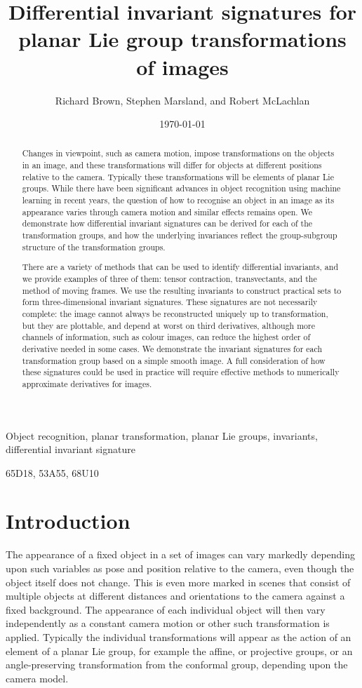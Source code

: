 \documentclass[review,onefignum,onetabnum]{siamonline190516}
\date{\today}
\title{Differential invariant signatures for planar Lie group transformations of images}
\author{Richard Brown, Stephen Marsland, and Robert McLachlan}
\begin{document}
\maketitle
\begin{abstract}
Changes in viewpoint, such as camera motion, impose transformations on the objects in an image, and these transformations will differ for objects at different positions relative to the camera. Typically these transformations will be elements of planar Lie groups. While there have been significant advances in object recognition using machine learning in recent years, the question of how to recognise an object in an image as its appearance varies through camera motion and similar effects remains open. We demonstrate how differential invariant signatures can be derived for each of the transformation groups, and how the underlying invariances reflect the group-subgroup structure of the transformation groups. 

There are a variety of methods that can be used to identify differential invariants, and we provide examples of three of them: tensor contraction, transvectants, and the method of moving frames. We use the resulting invariants to construct practical sets to form three-dimensional invariant signatures. These signatures are not necessarily complete: the image cannot always be reconstructed uniquely up to transformation, but they are plottable, and depend at worst on third derivatives, although more channels of information, such as colour images, can reduce the highest order of derivative needed in some cases. We demonstrate the invariant signatures for each transformation group based on a simple smooth image. A full consideration of how these signatures could be used in practice will require effective methods to numerically approximate derivatives for images.
\end{abstract}


\begin{keywords}
Object recognition, planar transformation, planar Lie groups, invariants, differential invariant signature
\end{keywords}

\begin{AMS}
65D18, 53A55, 68U10
\end{AMS}

\section{Introduction}
The appearance of a fixed object in a set of images can vary markedly depending upon such variables as pose and position relative to the camera, even though the object itself does not change. This is even more marked in scenes that consist of multiple objects at different distances and orientations to the camera against a fixed background. The appearance of each individual object will then vary independently as a constant camera motion or other such transformation is applied. Typically the individual transformations will appear as the action of an element of a planar Lie group, for example the affine, or projective groups, or an angle-preserving transformation from the conformal group, depending upon the camera model. 
\end{document}
